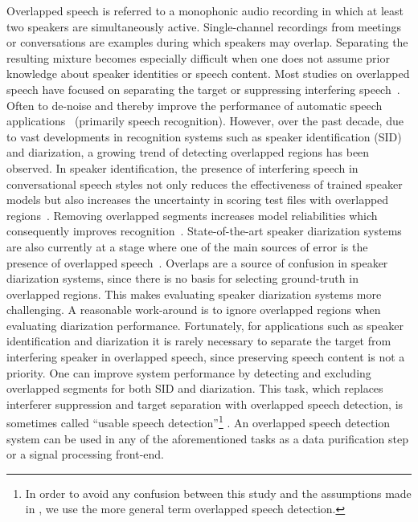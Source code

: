 Overlapped speech is referred to a monophonic audio recording in which at least two speakers are simultaneously active. 
Single-channel recordings from meetings or conversations are examples during which speakers may overlap.
Separating the resulting mixture becomes especially difficult when one does not assume prior knowledge about speaker identities or speech content. 
Most studies on overlapped speech have focused on separating the target or suppressing interfering speech~\cite{morgan_cochannel}. 
Often to de-noise and thereby improve the performance of automatic speech applications~\cite{Quat_Dan_cch_sup,Chazan_93,cooke20101} (primarily speech recognition). 
However, over the past decade, due to vast developments in recognition systems such as speaker identification (SID) and diarization, a growing trend of detecting overlapped regions has been observed. 
In speaker identification, the presence of interfering speech in conversational speech styles not only reduces the effectiveness of trained speaker models but also increases the uncertainty in scoring test files with overlapped regions~\cite{yantorno_report}. 
Removing overlapped segments increases model reliabilities which consequently improves recognition~\cite{shokouhi2015}.    
State-of-the-art speaker diarization systems are also currently at a stage where one of the main sources of error is the presence of overlapped speech~\cite{boakye_icassp_08,zelenak12Trans}. 
Overlaps are a source of confusion in speaker diarization systems, since there is no basis for selecting ground-truth in overlapped regions. 
This makes evaluating speaker diarization systems more challenging. 
A reasonable work-around is to ignore overlapped regions when evaluating diarization performance. 
Fortunately, for applications such as speaker identification and diarization it is rarely necessary to separate the target from interfering speaker in overlapped speech, since preserving speech content is not a priority. 
One can improve system performance by detecting and excluding overlapped segments for both SID and diarization. 
This task, which replaces interferer suppression and target separation with overlapped speech detection, is sometimes called ``usable speech detection''\footnote{In order to avoid any confusion between this study and the assumptions made in \cite{yantorno_report}, we use the more general term overlapped speech detection.} \cite{yantorno_report}. 
An overlapped speech detection system can be used in any of the aforementioned tasks as a data purification step or a signal processing front-end. 

